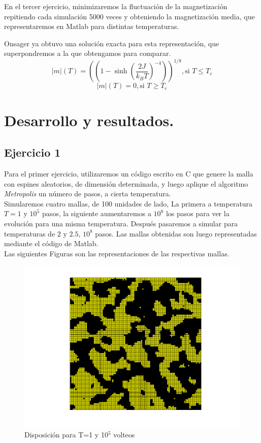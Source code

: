 \documentclass[a4paper,12pt,spanish]{article}
\begin{document}
	
	En el tercer ejercicio, minimizaremos la fluctuación de la magnetización repitiendo cada simulación 5000 veces y obteniendo la magnetización media, que representaremos en Matlab para distintas temperaturas. 
	
	Onsager ya obtuvo una solución exacta para esta representación, que superpondremos a la que obtengamos para comparar.
	\[ |m|(T) = \left( (1 - \sinh \left(\frac{2J}{k_B T}\right)^{-4})\right)^{1/8}, \text{si $T\leq T_c$}	\]
	\[ |m|(T) = 0, \text{si $T\geq T_c$}	\]
	
	
	
	
	
	
	
	


	\section{Desarrollo y resultados.}
	
	\subsection{Ejercicio 1}
	
	Para el primer ejercicio, utilizaremos un código escrito en C que genere la malla con espines aleatorios, de dimensión determinada, y luego aplique el algoritmo \textit{Metropolis} un número de pasos, a cierta temperatura. \\
	
	
	Simularemos cuatro mallas, de 100 unidades de lado,
	La primera a temperatura $T = 1$ y $10^5$ pasos, la siguiente aumentaremos a $10^8$ los pasos para ver la evolución para una misma temperatura. Después pasaremos a simular para temperaturas de $2$ y $2.5$, $10^8$ pasos. Las mallas obtenidas son luego representadas mediante el código de Matlab.\\
	
	Las siguientes Figuras son las representaciones de las respectivas mallas.
	
	\begin{figure}[H]
		\centering
		\includegraphics[width=0.8\linewidth]{../obtencion_resultados/a}
		\caption{Disposición para T=1 y 10$^5$ volteos}
		\label{fig:a}
	\end{figure}
\end{document}
